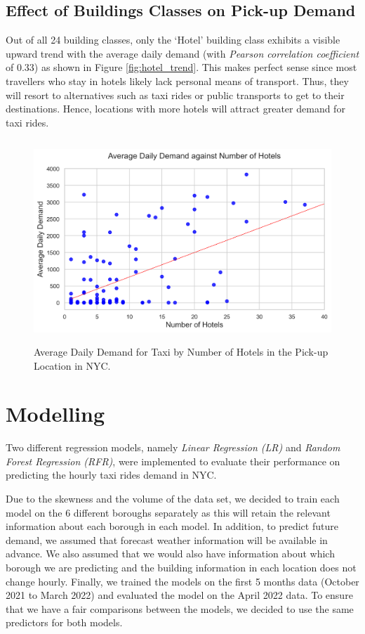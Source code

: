 \documentclass[11pt]{article}
\begin{document}
\subsection{Effect of Buildings Classes on Pick-up Demand}
Out of all 24 building classes, only the `Hotel' building class exhibits a visible upward trend with the average daily demand (with \textit{Pearson correlation coefficient} of 0.33) as shown in Figure \ref{fig:hotel_trend}. This makes perfect sense since most travellers who stay in hotels likely lack personal means of transport. Thus, they will resort to alternatives such as taxi rides or public transports to get to their destinations. Hence, locations with more hotels will attract greater demand for taxi rides.
\vspace{-2mm}
\begin{figure}[h]
    \centering
    \includegraphics[width=5in, height=3in]{plots/hotel_on_pickup.png}

    \caption{Average Daily Demand for Taxi by Number of Hotels in the Pick-up Location in NYC.}
    \label{fig:label1}
\end{figure}


\section{Modelling}
Two different regression models, namely \textit{Linear Regression (LR)} and \textit{Random Forest Regression (RFR)}, were implemented to evaluate their performance on predicting the hourly taxi rides demand in NYC.

Due to the skewness and the volume of the data set, we decided to train each model on the 6 different boroughs separately as this will retain the relevant information about each borough in each model. In addition, to predict future demand, we assumed that forecast weather information will be available in advance. We also assumed that we would also have information about which borough we are predicting and the building information in each location does not change hourly. Finally, we trained the models on the first 5 months data (October 2021 to March 2022) and evaluated the model on the April 2022 data. To ensure that we have a fair comparisons between the models, we decided to use the same predictors for both models. 
\end{document}

